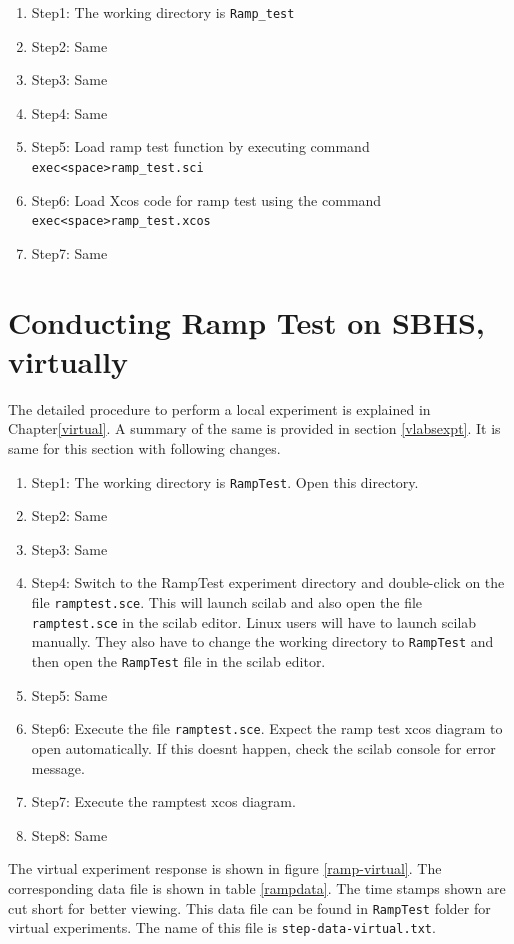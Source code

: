 \begin{enumerate}
\item Step1: The working directory is {\tt  Ramp\_test}
\item Step2: Same
\item Step3: Same
\item Step4: Same
\item Step5: Load ramp test function by executing command\\ {\tt exec<space>ramp\_test.sci}
\item Step6: Load Xcos code for ramp test using the command\\ {\tt exec<space>ramp\_test.xcos}
\item Step7: Same
\end{enumerate}
\section{Conducting Ramp Test on SBHS, virtually}
The detailed procedure to perform a local experiment is explained in Chapter\ref{virtual}. A summary of the same is provided in section \ref{vlabsexpt}. It is same for this section with following changes.

\begin{enumerate}
\item Step1: The working directory is {\tt  RampTest}. Open this directory.
\item Step2: Same
\item Step3: Same
\item Step4:  Switch to the RampTest experiment directory and double-click on the file {\tt ramptest.sce}. This will launch scilab and also open the file {\tt ramptest.sce} in the scilab editor. Linux users will have to launch scilab manually. They also have to change the working directory to {\tt  RampTest} and then open the {\tt  RampTest} file in the scilab editor.
\item Step5: Same
\item Step6: Execute the file {\tt ramptest.sce}.  Expect the ramp test xcos diagram to open automatically. If this doesnt happen, check the scilab console for error message.
\item Step7: Execute the ramptest xcos diagram.
\item Step8: Same
\end{enumerate}


 The virtual experiment response is shown in figure \ref{ramp-virtual}. The corresponding data file is shown in table \ref{rampdata}. The time stamps shown are cut short for better viewing. This data file can be found in {\tt RampTest} folder for virtual experiments. The name of this file is {\tt step-data-virtual.txt}.


